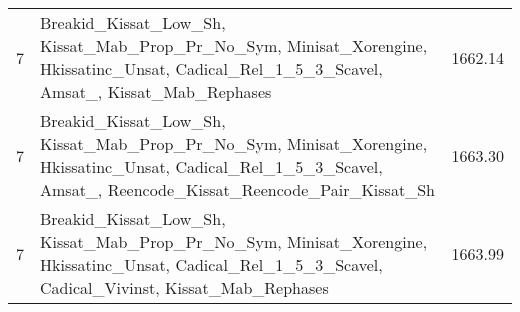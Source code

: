 \begin{tabular}{l|p{.9\linewidth}r}
7 & Breakid\_Kissat\_Low\_Sh, Kissat\_Mab\_Prop\_Pr\_No\_Sym, Minisat\_Xorengine, Hkissatinc\_Unsat, Cadical\_Rel\_1\_5\_3\_Scavel, Amsat\_, Kissat\_Mab\_Rephases & 1662.14 \\
7 & Breakid\_Kissat\_Low\_Sh, Kissat\_Mab\_Prop\_Pr\_No\_Sym, Minisat\_Xorengine, Hkissatinc\_Unsat, Cadical\_Rel\_1\_5\_3\_Scavel, Amsat\_, Reencode\_Kissat\_Reencode\_Pair\_Kissat\_Sh & 1663.30 \\
7 & Breakid\_Kissat\_Low\_Sh, Kissat\_Mab\_Prop\_Pr\_No\_Sym, Minisat\_Xorengine, Hkissatinc\_Unsat, Cadical\_Rel\_1\_5\_3\_Scavel, Cadical\_Vivinst, Kissat\_Mab\_Rephases & 1663.99 \\
\bottomrule
\end{tabular}
